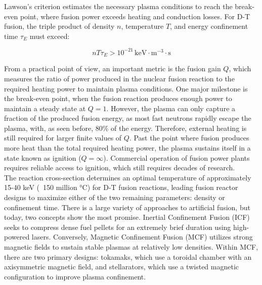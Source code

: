 Lawson's criterion \cite{Lawson1957} estimates the necessary plasma conditions to reach the break-even point, where fusion power exceeds heating and conduction losses. For D-T fusion, the triple product of density $n$, temperature $T$, and energy confinement time $\tau_E$ must exceed:

\begin{equation}
	\label{eq:LawsonCriterionDT}
	nT\tau_E > 10^{-21} \, \text{keV} \cdot \text{m}^{-3} \cdot \text{s}
\end{equation}

From a practical point of view, an important metric is the fusion gain $Q$, which measures the ratio of power produced in the nuclear fusion reaction to the required heating power to maintain plasma conditions. One major milestone is the break-even point, when the fusion reaction produces enough power to maintain a steady state at $Q=1$. However, the plasma can only capture a fraction of the produced fusion energy, as most fast neutrons rapidly escape the plasma, with, as seen before, 80\% of the energy. Therefore, external heating is still required for larger finite values of $Q$. Past the point where fusion produces more heat than the total required heating power, the plasma sustains itself in a state known as ignition ($Q=\infty$). Commercial operation of fusion power plants requires reliable access to ignition, which still requires decades of research. \\

The reaction cross-section determines an optimal temperature of approximately 15-40 keV (~150 million °C) for D-T fusion reactions, leading fusion reactor designs to maximize either of the two remaining parameters: density or confinement time. There is a large variety of approaches to artificial fusion, but today, two concepts show the most promise. Inertial Confinement Fusion (ICF) seeks to compress dense fuel pellets for an extremely brief duration using high-powered lasers. Conversely, Magnetic Confinement Fusion (MCF) utilizes strong magnetic fields to sustain stable plasmas at relatively low densities. Within MCF, there are two primary designs: tokamaks, which use a toroidal chamber with an axisymmetric magnetic field, and stellarators, which use a twisted magnetic configuration to improve plasma confinement.\\

